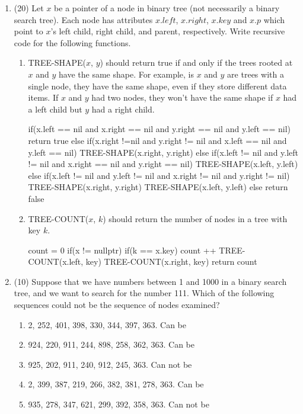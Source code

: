 \documentclass[12pt]{article}
\begin{document}
\begin{enumerate}
\item (20) Let $x$ be a pointer of a node in binary tree (not necessarily a binary search tree). 
Each node has attributes 
$x.left$, $x.right$, $x.key$ and $x.p$ which point to $x$'s left child, right child, and parent, 
respectively. Write recursive code for the following functions.
\begin{enumerate}

\item TREE-SHAPE($x$, $y$) should return true if and only if the trees rooted at $x$ and $y$
have the same shape. For example, is $x$ and $y$ are trees with a single node, they have the 
same shape, even if they store different data items. If $x$ and $y$ had two nodes, they won't
have the same shape if $x$ had a left child but $y$ had a right child.
\begin{algorithm}[H]
 \begin{algorithmic}[1]
 \State if(x.left == nil and x.right == nil and y.right == nil and y.left == nil)
 \State \indent return true
 \State else if(x.right !=nil and y.right != nil and x.left == nil and y.left == nil)
 \State \indent TREE-SHAPE(x.right, y.right)
 \State else if(x.left != nil and y.left != nil and x.right == nil and y.right == nil)
 \State \indent TREE-SHAPE(x.left, y.left)
 \State else if(x.left != nil and y.left != nil and x.right != nil and y.right != nil)
 \State \indent TREE-SHAPE(x.right, y.right)
 \State \indent TREE-SHAPE(x.left, y.left)
 \State else return false
 \EndProcedure
\end{algorithmic}
\end{algorithm}

\item TREE-COUNT($x$, $k$) should return the number of nodes in a tree with key $k$.
\begin{algorithm}[H]
 \begin{algorithmic}[1]
 \State count = 0
 \State if(x != nullptr)
 \State \indent if(k == x.key)
 \State \indent \indent count ++
 \State \indent TREE-COUNT(x.left, key)
 \State \indent TREE-COUNT(x.right, key)
 \State return count
 \EndProcedure
\end{algorithmic}
\end{algorithm}
\end{enumerate}

\item (10) Suppose that we have numbers between 1 and 1000 in a binary search tree, and we
want to search for the number 111. Which of the following sequences could not be
the sequence of nodes examined?
\begin{enumerate}
\item 2, 252, 401, 398, 330, 344, 397, 363. Can be
\item 924, 220, 911, 244, 898, 258, 362, 363. Can be
\item 925, 202, 911, 240, 912, 245, 363. Can not be
\item 2, 399, 387, 219, 266, 382, 381, 278, 363. Can be
\item 935, 278, 347, 621, 299, 392, 358, 363. Can not be
\end{enumerate}


\end{enumerate}
\end{document}

